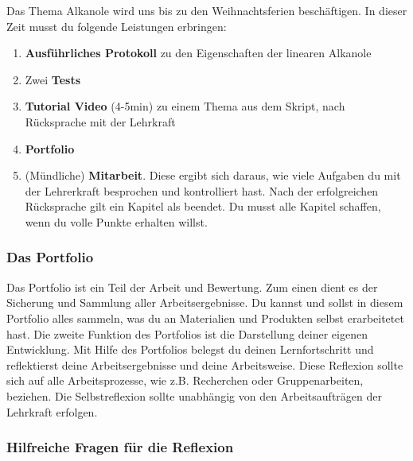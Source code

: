 \documentclass{scrartcl}  %
\begin{document}
				Das Thema Alkanole wird uns bis zu den Weihnachtsferien beschäftigen. In dieser Zeit musst du folgende Leistungen erbringen:
				\begin{enumerate}
					\item \textbf{Ausführliches Protokoll} zu den Eigenschaften der linearen Alkanole
					\item Zwei \textbf{Tests}
					\item \textbf{Tutorial Video} (4-5min) zu einem Thema aus dem Skript, nach Rücksprache mit der Lehrkraft
					\item \textbf{Portfolio}
					\item (Mündliche) \textbf{Mitarbeit}. Diese ergibt sich daraus, wie viele Aufgaben du mit der Lehrerkraft besprochen und kontrolliert hast. Nach der erfolgreichen Rücksprache gilt ein Kapitel als beendet. Du musst alle Kapitel schaffen, wenn du volle Punkte erhalten willst.  
				\end{enumerate}
	
			\subsubsection{Das Portfolio}
			
			Das Portfolio ist ein Teil der Arbeit und Bewertung. Zum einen dient es der Sicherung und Sammlung aller Arbeitsergebnisse. Du kannst und sollst in diesem Portfolio alles sammeln, was du an Materialien und Produkten selbst erarbeitetet hast. 
			Die zweite Funktion des Portfolios ist die Darstellung deiner eigenen Entwicklung. Mit Hilfe des Portfolios belegst du deinen Lernfortschritt und reflektierst deine Arbeitsergebnisse und deine Arbeitsweise. Diese Reflexion sollte sich  auf alle Arbeitsprozesse, wie z.B. Recherchen oder Gruppenarbeiten, beziehen. Die Selbstreflexion sollte unabhängig von den Arbeitsaufträgen der Lehrkraft erfolgen.
	
			\subsubsection{Hilfreiche Fragen für die Reflexion}
	
				\begin{center}
				\end{center}
	
\end{document}
